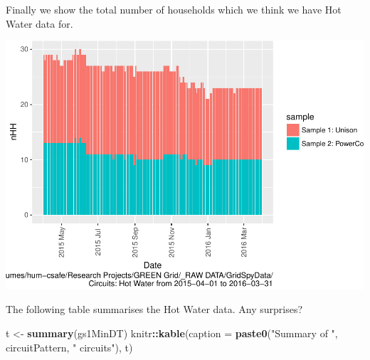 \documentclass[]{article}
\newenvironment{Shaded}{\begin{snugshade}}{\end{snugshade}}
\newcommand{\KeywordTok}[1]{\textcolor[rgb]{0.13,0.29,0.53}{\textbf{#1}}}
\newcommand{\DataTypeTok}[1]{\textcolor[rgb]{0.13,0.29,0.53}{#1}}
\newcommand{\StringTok}[1]{\textcolor[rgb]{0.31,0.60,0.02}{#1}}
\newcommand{\OperatorTok}[1]{\textcolor[rgb]{0.81,0.36,0.00}{\textbf{#1}}}
\newcommand{\NormalTok}[1]{#1}
\begin{document}
Finally we show the total number of households which we think we have
Hot Water data for.

\includegraphics{nzGGHouseholdPowerDemandProfile_Hot Water_2015-04-01_2016-03-31_files/figure-latex/liveDataHouseholds-1.pdf}

The following table summarises the Hot Water data. Any surprises?

\begin{Shaded}
\begin{Highlighting}[]
\NormalTok{t <-}\StringTok{ }\KeywordTok{summary}\NormalTok{(gs1MinDT)}
\NormalTok{knitr}\OperatorTok{::}\KeywordTok{kable}\NormalTok{(}\DataTypeTok{caption =} \KeywordTok{paste0}\NormalTok{(}\StringTok{"Summary of "}\NormalTok{, circuitPattern, }\StringTok{" circuits"}\NormalTok{), t)}
\end{Highlighting}
\end{Shaded}
\end{document}
